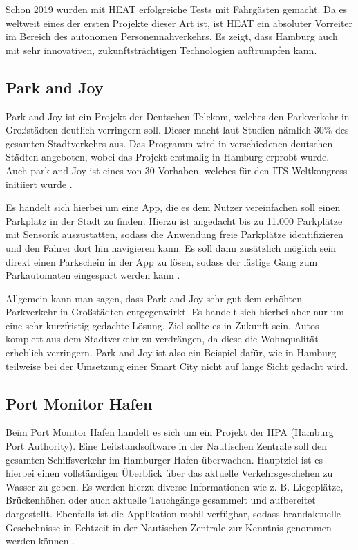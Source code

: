 Schon 2019 wurden mit HEAT erfolgreiche Tests mit Fahrgästen gemacht.
Da es weltweit eines der ersten Projekte dieser Art ist, ist HEAT ein absoluter Vorreiter im Bereich des autonomen Personennahverkehrs.
Es zeigt, dass Hamburg auch mit sehr innovativen, zukunftsträchtigen Technologien auftrumpfen kann.

\subsection{Park and Joy}

Park and Joy ist ein Projekt der Deutschen Telekom, welches den Parkverkehr in Großstädten deutlich verringern soll. Dieser macht laut Studien nämlich 30\% des gesamten Stadtverkehrs aus. Das Programm wird in verschiedenen deutschen Städten angeboten, wobei das Projekt erstmalig in Hamburg erprobt wurde. Auch park and Joy ist eines von 30 Vorhaben, welches für den ITS Weltkongress initiiert wurde \autocite[vgl.][]{SmartCityKompass.2020a}.

Es handelt sich hierbei um eine App, die es dem Nutzer vereinfachen soll einen Parkplatz in der Stadt zu finden. Hierzu ist angedacht bis zu 11.000 Parkplätze mit Sensorik auszustatten, sodass die Anwendung freie Parkplätze identifizieren und den Fahrer dort hin navigieren kann. Es soll dann zusätzlich möglich sein direkt einen Parkschein in der App zu lösen, sodass der lästige Gang zum Parkautomaten eingespart werden kann \autocite[vgl.][]{ParkandJoy.2020}.

Allgemein kann man sagen, dass Park and Joy sehr gut dem erhöhten Parkverkehr in Großstädten entgegenwirkt. Es handelt sich hierbei aber nur um eine sehr kurzfristig gedachte Lösung. Ziel sollte es in Zukunft sein, Autos komplett aus dem Stadtverkehr zu verdrängen, da diese die Wohnqualität erheblich verringern. Park and Joy ist also ein Beispiel dafür, wie in Hamburg teilweise bei der Umsetzung einer Smart City nicht auf lange Sicht gedacht wird.

\subsection{Port Monitor Hafen}

Beim Port Monitor Hafen handelt es sich um ein Projekt der HPA (Hamburg Port Authority).
Eine Leitstandsoftware in der Nautischen Zentrale soll den gesamten Schiffsverkehr im Hamburger Hafen überwachen. Hauptziel ist es hierbei einen vollständigen Überblick über das aktuelle Verkehrsgeschehen zu Wasser zu geben.
Es werden hierzu diverse Informationen wie z. B. Liegeplätze, Brückenhöhen oder auch aktuelle Tauchgänge gesammelt und aufbereitet dargestellt.
Ebenfalls ist die Applikation mobil verfügbar, sodass brandaktuelle Geschehnisse in Echtzeit in der Nautischen Zentrale zur Kenntnis genommen werden können \autocite[vgl.][]{SmartCityKompass.2020b}.

